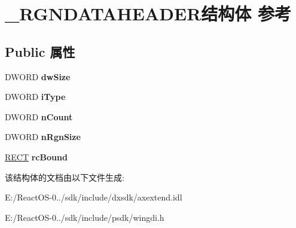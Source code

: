 \hypertarget{struct___r_g_n_d_a_t_a_h_e_a_d_e_r}{}\section{\+\_\+\+R\+G\+N\+D\+A\+T\+A\+H\+E\+A\+D\+E\+R结构体 参考}
\label{struct___r_g_n_d_a_t_a_h_e_a_d_e_r}
\subsection*{Public 属性}
\begin{DoxyCompactItemize}
\item 
\mbox{\label{struct___r_g_n_d_a_t_a_h_e_a_d_e_r_ae53b6c0ac70e7a74a09974337e45c386}} 
D\+W\+O\+RD {\bfseries dw\+Size}
\item 
\mbox{\label{struct___r_g_n_d_a_t_a_h_e_a_d_e_r_a188409c910ae24ba75154611bfa8e780}} 
D\+W\+O\+RD {\bfseries i\+Type}
\item 
\mbox{\label{struct___r_g_n_d_a_t_a_h_e_a_d_e_r_a7f5702b94a892240e8cc25875dd9fccc}} 
D\+W\+O\+RD {\bfseries n\+Count}
\item 
\mbox{\label{struct___r_g_n_d_a_t_a_h_e_a_d_e_r_ac1f2123e3c42dee263f5c44a9e2d4616}} 
D\+W\+O\+RD {\bfseries n\+Rgn\+Size}
\item 
\mbox{\label{struct___r_g_n_d_a_t_a_h_e_a_d_e_r_aef30dfc770ffa1bbd47e1e66378c4979}} 
\hyperlink{structtag_r_e_c_t}{R\+E\+CT} {\bfseries rc\+Bound}
\end{DoxyCompactItemize}


该结构体的文档由以下文件生成\+:\begin{DoxyCompactItemize}
\item 
E\+:/\+React\+O\+S-\/0../sdk/include/dxsdk/axextend.\+idl\item 
E\+:/\+React\+O\+S-\/0../sdk/include/psdk/wingdi.\+h\end{DoxyCompactItemize}
